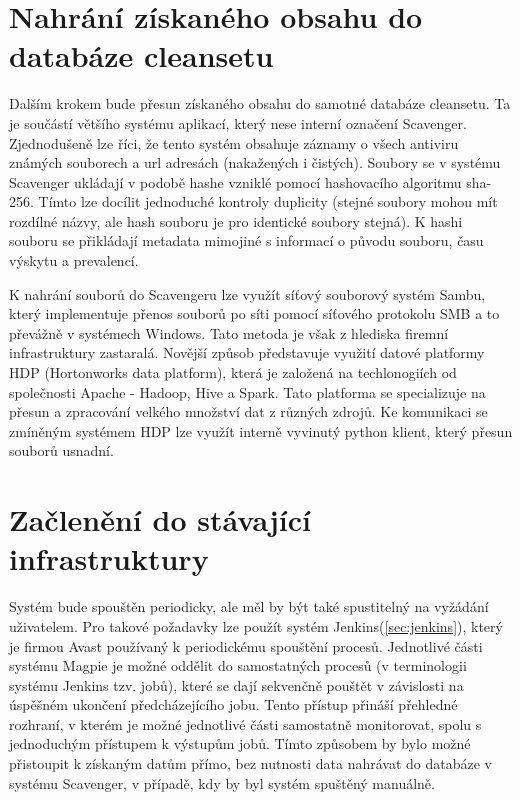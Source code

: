\documentclass[thesis=M,czech,hidelinks]{FITthesis}[2013/05/06]
\begin{document}
\section{Nahrání získaného obsahu do databáze cleansetu}
Dalším krokem bude přesun získaného obsahu do samotné databáze cleansetu. Ta je součástí většího systému aplikací, který nese interní označení Scavenger. Zjednodušeně lze říci, že tento systém obsahuje záznamy o všech antiviru známých souborech a url adresách (nakažených i čistých). Soubory se v systému Scavenger ukládají v podobě hashe vzniklé pomocí hashovacího algoritmu sha-256. Tímto lze docílit jednoduché kontroly duplicity (stejné soubory mohou mít rozdílné názvy, ale hash souboru je pro identické soubory stejná). K hashi souboru se přikládají metadata mimojiné s informací o původu souboru, času výskytu a prevalencí. 

K nahrání souborů do Scavengeru lze využít síťový souborový systém Sambu, který implementuje přenos souborů po síti pomocí síťového protokolu SMB a to převážně v systémech Windows. Tato metoda je však z hlediska firemní infrastruktury zastaralá. Novější způsob představuje využití datové platformy HDP (Hortonworks data platform), která je založená na techlonogiích od společnosti Apache - Hadoop, Hive a Spark. Tato platforma se specializuje na přesun a zpracování velkého množství dat z různých zdrojů. Ke komunikaci se zmíněným systémem HDP lze využít interně vyvinutý python klient, který přesun souborů usnadní.





\section{Začlenění do stávající infrastruktury}
Systém bude spouštěn periodicky, ale měl by být také spustitelný na vyžádání uživatelem. Pro takové požadavky lze použít systém Jenkins(\ref{sec:jenkins}), který je firmou Avast používaný k periodickému spouštění procesů. Jednotlivé části systému Magpie je možné oddělit do samostatných procesů (v terminologii systému Jenkins tzv. jobů), které se dají sekvenčně pouštět v závislosti na úspěšném ukončení předcházejícího jobu. Tento přístup přináší přehledné rozhraní, v kterém je možné jednotlivé části samostatně monitorovat, spolu s jednoduchým přístupem k výstupům jobů. Tímto způsobem by bylo možné přistoupit k získaným datům přímo, bez nutnosti data nahrávat do databáze v systému Scavenger, v případě, kdy by byl systém spuštěný manuálně.
\end{document}
